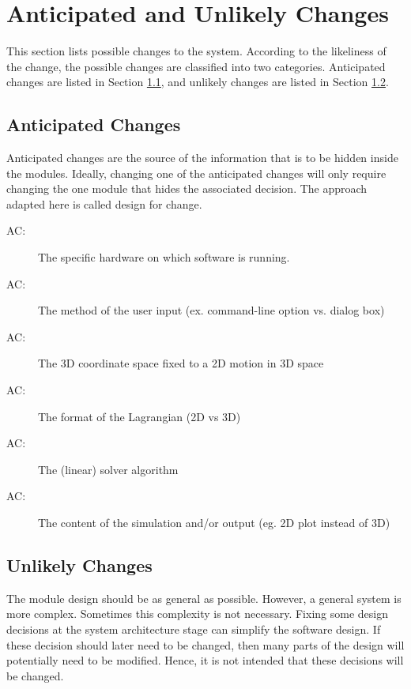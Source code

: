 \documentclass[12pt, titlepage]{article}
\newcounter{acnum}
\newcommand{\actheacnum}{AC\theacnum}
\begin{document}
\section{Anticipated and Unlikely Changes} \label{SecChange}

This section lists possible changes to the system. According to the likeliness
of the change, the possible changes are classified into two
categories. Anticipated changes are listed in Section \ref{SecAchange}, and
unlikely changes are listed in Section \ref{SecUchange}.

\subsection{Anticipated Changes} \label{SecAchange}

Anticipated changes are the source of the information that is to be hidden
inside the modules. Ideally, changing one of the anticipated changes will only
require changing the one module that hides the associated decision. 
The approach adapted here is called design for change.

\begin{description}
\item[ \actheacnum \label{acHardware}:] The specific
  hardware on which \progname software is running.
\item[ \actheacnum \label{acFormat}:] The method of the
  user input (ex. command-line option vs. dialog box)
\item[ \actheacnum \label{ac3d}:] The 3D coordinate space 
  fixed to a 2D motion in 3D space
\item[ \actheacnum \label{acCoord}:] The format of the
  Lagrangian (2D vs 3D)
\item[ \actheacnum \label{acLinear}:] The (linear)
  solver algorithm
\item[ \actheacnum \label{acCont}:] The content of the
  simulation and/or output (eg. 2D plot instead of 3D)
\end{description}

\subsection{Unlikely Changes} \label{SecUchange}

The module design should be as general as possible. However, a general system 
is more complex. Sometimes this complexity is not necessary. Fixing some design
decisions at the system architecture stage can simplify the software design. If
these decision should later need to be changed, then many parts of the design
will potentially need to be modified. Hence, it is not intended that these
decisions will be changed.
\end{document}
